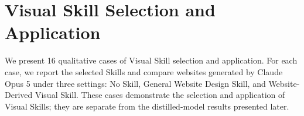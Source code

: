 \section{Visual Skill Selection and Application}
\label{app:skill_selection_application}

We present 16 qualitative cases of Visual Skill selection and application. For each case, we report the selected Skills and compare websites generated by Claude Opus 5 under three settings: No Skill, General Website Design Skill, and Website-Derived Visual Skill. These cases demonstrate the selection and application of Visual Skills; they are separate from the distilled-model results presented later.

